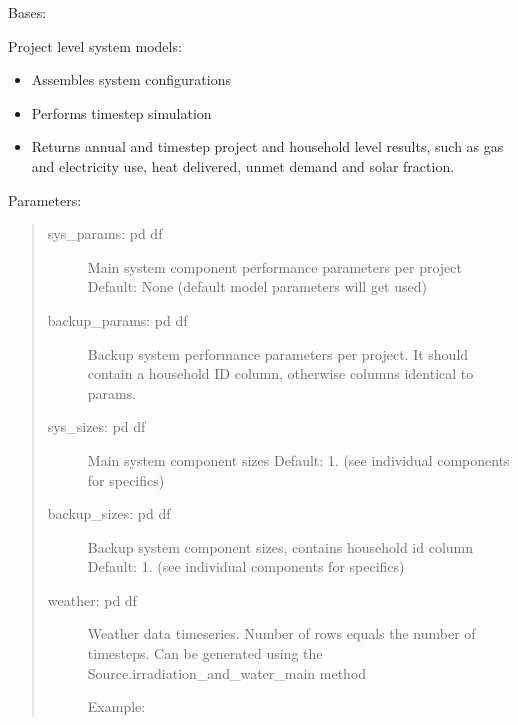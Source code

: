 \documentclass[letterpaper,10pt,english,openany]{sphinxmanual}
\begin{document}
\begin{fulllineitems}
\label{\detokenize{source/mswh.system:mswh.system.models.System}}
Bases: 

Project level system models:
\begin{itemize}
\item {} 
Assembles system configurations

\item {} 
Performs timestep simulation

\item {} 
Returns annual and timestep project and household
level results, such as gas and electricity use, heat delivered,
unmet demand and solar fraction.

\end{itemize}

Parameters:
\begin{quote}
\begin{description}
\item[{sys\_params: pd df}] \leavevmode
Main system component performance parameters per project
Default: None (default model parameters will get used)

\item[{backup\_params: pd df}] \leavevmode
Backup system performance parameters per project.
It should contain a household ID column, otherwise
columns identical to params.

\item[{sys\_sizes: pd df}] \leavevmode
Main system component sizes
Default: 1. (see individual components for specifics)

\item[{backup\_sizes: pd df}] \leavevmode
Backup system component sizes, contains household id column
Default: 1. (see individual components for specifics)

\item[{weather: pd df}] \leavevmode
Weather data timeseries.
Number of rows equals the number of timesteps. Can be
generated using the Source.irradiation\_and\_water\_main
method

Example:

\begin{sphinxVerbatim}[commandchars=\\\{\}]
  
\end{sphinxVerbatim}


\end{description}
\end{quote}
\end{fulllineitems}
\end{document}
